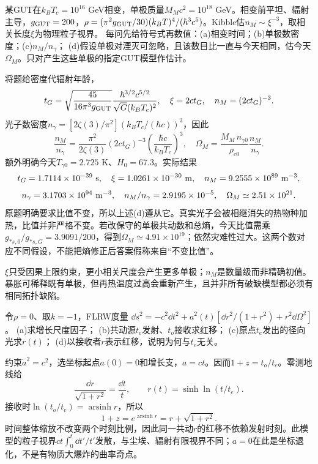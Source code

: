 \begin{exercise}
某GUT在$k_BT_c=10^{16}$ GeV相变，单极质量$M_Mc^2=10^{18}$ GeV。相变前平坦、辐射主导，$g_{\rm GUT}=200$，$\rho=(\pi^2g_{\rm GUT}/30)(k_BT)^4/(\hbar^3c^5)$。Kibble估$n_M\sim\xi^{-3}$，取相关长度$\xi$为物理粒子视界。
每问先给符号式再数值：(a)相变时间；(b)单极数密度；(c)$n_M/n_\gamma$；
(d)假设单极对湮灭可忽略，且该数目比一直与今天相同，估今天$\Omega_M$。只对产生这些单极的指定GUT模型作估计。
\end{exercise}
\begin{solution}
将题给密度代辐射年龄，
\[
 t_G=\sqrt{\frac{45}{16\pi^3g_{\rm GUT}}}
 \frac{\hbar^{3/2}c^{5/2}}{\sqrt G(k_BT_c)^2},\quad
 \xi=2ct_G,\quad n_M=(2ct_G)^{-3}.
\]
光子数密度$n_\gamma=[2\zeta(3)/\pi^2](k_BT_c/(\hbar c))^3$，因此
\[
 \frac{n_M}{n_\gamma}
 =\frac{\pi^2}{2\zeta(3)}
 (2ct_G)^{-3}\left(\frac{\hbar c}{k_BT_c}\right)^3,\quad
 \Omega_M=\frac{M_M\,n_{\gamma0}}{\rho_{c0}}\frac{n_M}{n_\gamma}.
\]
额外明确今天$T_{\gamma0}=2.725$ K、$H_0=67.3$。实际结果
\[
 t_G=1.7114\times10^{-39}\ {\rm s},\quad
 \xi=1.0261\times10^{-30}\ {\rm m},\quad
 n_M=9.2555\times10^{89}\ {\rm m^{-3}},
\]
\[
 n_\gamma=3.1703\times10^{94}\ {\rm m^{-3}},\quad
 n_M/n_\gamma=2.9195\times10^{-5},\quad
 \Omega_M\simeq2.51\times10^{21}.
\]
原题明确要求比值不变，所以上述(d)遵从它。真实光子会被相继消失的热物种加热，比值并非严格不变。若改保守的单极共动数和总熵，今天比值需乘$g_{*s,0}/g_{{*s},G}=3.9091/200$，得到$\Omega_M\simeq4.91\times10^{19}$；依然灾难性过大。这两个数对应不同假设，不能把熵修正后答案假称来自“不变比值”。

$\xi$只受因果上限约束，更小相关尺度会产生更多单极；$n_M$是数量级而非精确初值。暴胀可稀释既有单极，但再热温度过高会重新产生，且并非所有破缺模型都必须有相同拓扑缺陷。
\end{solution}

\begin{exercise}
令$\rho=0$、取$k=-1$，FLRW度量
$\dd s^2=-c^2\dd t^2+a^2(t)[\dd r^2/(1+r^2)+r^2\dd\Omega^2]$。
(a)求增长尺度因子；
(b)共动源$t_e$发射、$t_o$接收求红移；
(c)原点$t_e$发出的径向光求$r(t)$；
(d)以接收者$r$表示红移，说明为何与$t_e$无关。
\end{exercise}
\begin{solution}
约束$\dot a^2=c^2$，选坐标起点$a(0)=0$和增长支，$a=ct$。因而$1+z=t_o/t_e$。零测地线给
\[
 \frac{\dd r}{\sqrt{1+r^2}}=\frac{\dd t}{t},
 \qquad r(t)=\sinh\ln(t/t_e).
\]
接收时$\ln(t_o/t_e)=\operatorname{arsinh}r$，所以
\[
 1+z=e^{\operatorname{arsinh}r}=r+\sqrt{1+r^2}.
\]
时间整体缩放不改变两个时刻比例，因此同一共动$r$的红移不依赖发射时刻。此模型的粒子视界$ct\int_0^t\dd t'/t'$发散，与尘埃、辐射有限视界不同；$a=0$在此是坐标退化，不是有物质大爆炸的曲率奇点。
\end{solution}

